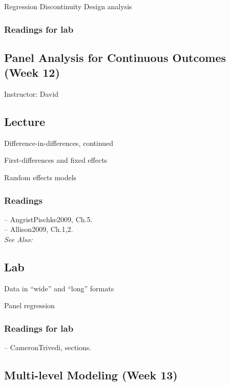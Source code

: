 \documentclass[11pt,a4paper]{article}
\newcommand{\textbook}[2][]{\noindent -- {#2}, {#1}.\vspace{.25em}\\}
\newcommand{\david}{\vspace{1em}\noindent Instructor: David\vspace{1em}\\}
\newcommand{\seealso}{\noindent \emph{See Also:}\\}
\begin{document}
\begin{itemize*}
\item Regression Discontinuity Design analysis
\end{itemize*}

\subsubsection*{Readings for lab}



\clearpage
\subsection{Panel Analysis for Continuous Outcomes (Week 12)}
\emph{}

\david


\subsection*{Lecture}
\begin{itemize*}
\item Difference-in-differences, continued
\item First-differences and fixed effects
\item Random effects models
\end{itemize*}

\subsubsection*{Readings}
\textbook[Ch.5]{AngristPischke2009}
\textbook[Ch.1,2]{Allison2009}


\seealso


\subsection*{Lab}

\begin{itemize*}
\item Data in ``wide'' and ``long'' formats
\item Panel regression
\end{itemize*}

\subsubsection*{Readings for lab}
\textbook[sections]{CameronTrivedi}


\clearpage
\subsection{Multi-level Modeling (Week 13)}
\emph{}
\end{document}
